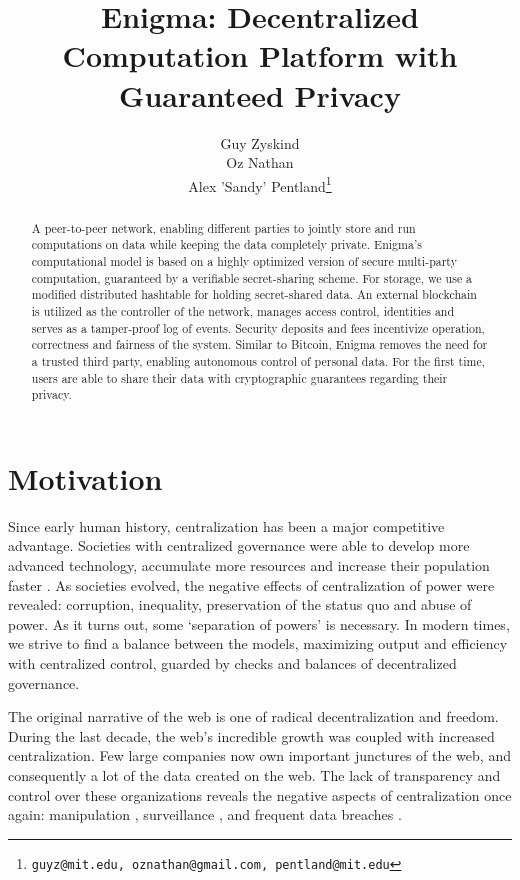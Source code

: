 \documentclass{article} \usepackage{nips13submit_e,times}
\title{Enigma: Decentralized Computation Platform with Guaranteed Privacy}
\author{
Guy Zyskind\\
\And
Oz Nathan\\
\And
Alex 'Sandy' Pentland\thanks{\texttt{guyz@mit.edu, oznathan@gmail.com, pentland@mit.edu}}\\
}
\begin{document}
\maketitle

\begin{abstract}

A peer-to-peer network, enabling different parties to jointly store and run computations on data while keeping the data completely private. Enigma's computational model is based on a highly optimized version of secure multi-party computation, guaranteed by a verifiable secret-sharing scheme. For storage, we use a modified distributed hashtable for holding secret-shared data. An external blockchain is utilized as the controller of the network, manages access control, identities and serves as a tamper-proof log of events. Security deposits and fees incentivize operation, correctness and fairness of the system. Similar to Bitcoin, Enigma removes the need for a trusted third party, enabling autonomous control of personal data. For the first time, users are able to share their data with cryptographic guarantees regarding their privacy.

\end{abstract}
 


\section{Motivation}

Since early human history, centralization has been a major competitive advantage. Societies with centralized governance were able to develop more advanced technology, accumulate more resources and increase their population faster \cite{intro1}. As societies evolved, the negative effects of centralization of power were revealed: corruption, inequality, preservation of the status quo and abuse of power. As it turns out, some ‘separation of powers’ \cite{intro2} is necessary. In modern times, we strive to find a balance between the models, maximizing output and efficiency with centralized control, guarded by checks and balances of decentralized governance. 

The original narrative of the web is one of radical decentralization and freedom\cite{intro3}. During the last decade, the web's incredible growth was coupled with increased centralization. Few large companies now own important junctures of the web, and consequently a lot of the data created on the web. The lack of transparency and control over these organizations reveals the negative aspects of centralization once again: manipulation \cite{intro4}, surveillance \cite{intro5}, and frequent data breaches \cite{intro6}.
\end{document}
